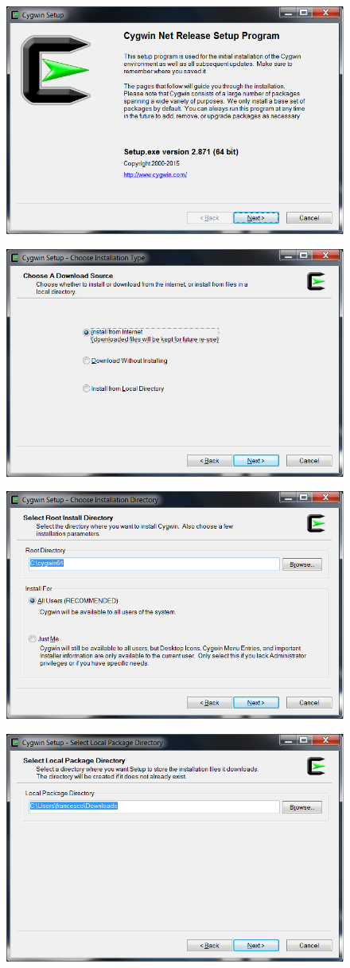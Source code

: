 \begin{figure}[ht!]
  \centering
  \includegraphics[width=0.7\linewidth]{2015/Aug/25/2pic.png}
\end{figure}
\begin{figure}[h!]
  \centering
  \includegraphics[width=0.7\linewidth]{2015/Aug/25/3pic.png}
\end{figure}

\pagebreak

\begin{figure}[ht!]
  \centering
  \includegraphics[width=0.7\linewidth]{2015/Aug/25/4pic.png}
\end{figure}
\begin{figure}[h!]
  \centering
  \includegraphics[width=0.7\linewidth]{2015/Aug/25/5pic.png}
\end{figure}

